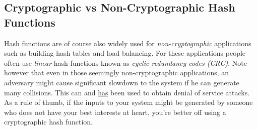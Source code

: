 \subsection{Cryptographic vs Non-Cryptographic Hash
Functions}\label{Cryptographic-vs-Non-Cryptogra}

Hash functions are of course also widely used for
\emph{non-cryptographic} applications such as building hash tables and
load balancing. For these applications people often use \emph{linear}
hash functions known as \emph{cyclic redundancy codes (CRC)}. Note
however that even in those seemingly non-cryptographic applications, an
adversary might cause significant slowdown to the system if he can
generate many collisions. This can and
\href{http://arstechnica.com/business/2011/12/huge-portions-of-web-vulnerable-to-hashing-denial-of-service-attack/}{has}
been used to obtain denial of service attacks. As a rule of thumb, if
the inputs to your system might be generated by someone who does not
have your best interests at heart, you're better off using a
cryptographic hash function.
